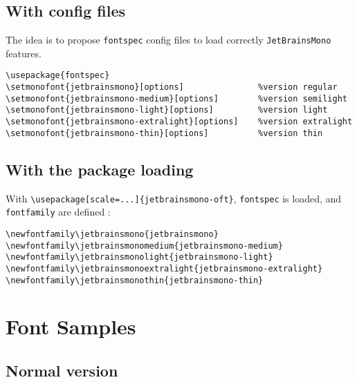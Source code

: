 \documentclass{article}
\begin{document}
\subsection{With config files}

The idea is to propose \texttt{fontspec} config files to load correctly \texttt{JetBrainsMono} features.

\begin{lstlisting}[language={[latex]TeX},basicstyle=\footnotesize\ttfamily,commentstyle=\itshape\color{gray},keywordstyle=\color{magenta},tabsize=4,frame=single]
\usepackage{fontspec}
\setmonofont{jetbrainsmono}[options]               %version regular
\setmonofont{jetbrainsmono-medium}[options]        %version semilight
\setmonofont{jetbrainsmono-light}[options]         %version light
\setmonofont{jetbrainsmono-extralight}[options]    %version extralight
\setmonofont{jetbrainsmono-thin}[options]          %version thin
\end{lstlisting}

\subsection{With the package loading}

With \lstinline[language={[latex]TeX},basicstyle=\ttfamily]|\usepackage[scale=...]{jetbrainsmono-oft}|, \lstinline[language={[latex]TeX},basicstyle=\ttfamily]|fontspec| is loaded, and \lstinline[language={[latex]TeX},basicstyle=\ttfamily]|fontfamily| are defined :

\begin{lstlisting}[language={[latex]TeX},basicstyle=\footnotesize\ttfamily,commentstyle=\itshape\color{gray},keywordstyle=\color{magenta},tabsize=4,frame=single]
\newfontfamily\jetbrainsmono{jetbrainsmono}
\newfontfamily\jetbrainsmonomedium{jetbrainsmono-medium}
\newfontfamily\jetbrainsmonolight{jetbrainsmono-light}
\newfontfamily\jetbrainsmonoextralight{jetbrainsmono-extralight}
\newfontfamily\jetbrainsmonothin{jetbrainsmono-thin}
\end{lstlisting}

\section{Font Samples}

\subsection{Normal version}
\end{document}
